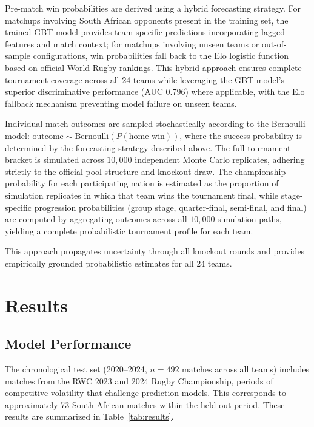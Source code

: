 \documentclass[12pt,a4paper,onecolumn]{article}
\begin{document}
Pre-match win probabilities are derived using a hybrid forecasting strategy. For matchups involving South African opponents present in the training set, the trained GBT model provides team-specific predictions incorporating lagged features and match context; for matchups involving unseen teams or out-of-sample configurations, win probabilities fall back to the Elo logistic function based on official World Rugby rankings. This hybrid approach ensures complete tournament coverage across all 24 teams while leveraging the GBT model's superior discriminative performance (AUC 0.796) where applicable, with the Elo fallback mechanism preventing model failure on unseen teams.

Individual match outcomes are sampled stochastically according to the Bernoulli model: $\text{outcome} \sim \text{Bernoulli}\!\left(P(\text{home win})\right)$, where the success probability is determined by the forecasting strategy described above. The full tournament bracket is simulated across $10{,}000$ independent Monte Carlo replicates, adhering strictly to the official pool structure and knockout draw. The championship probability for each participating nation is estimated as the proportion of simulation replicates in which that team wins the tournament final, while stage-specific progression probabilities (group stage, quarter-final, semi-final, and final) are computed by aggregating outcomes across all $10{,}000$ simulation paths, yielding a complete probabilistic tournament profile for each team.

This approach propagates uncertainty through all knockout rounds and provides empirically grounded probabilistic estimates for all 24 teams. \cite{Leitner2010}

\section{Results}

\subsection{Model Performance}
The chronological test set (2020–2024, $n=492$ matches across all teams) includes matches from the RWC 2023 and 2024 Rugby Championship, periods of competitive volatility that challenge prediction models. This corresponds to approximately 73 South African matches within the held-out period. These results are summarized in Table~\ref{tab:results}.
\end{document}
